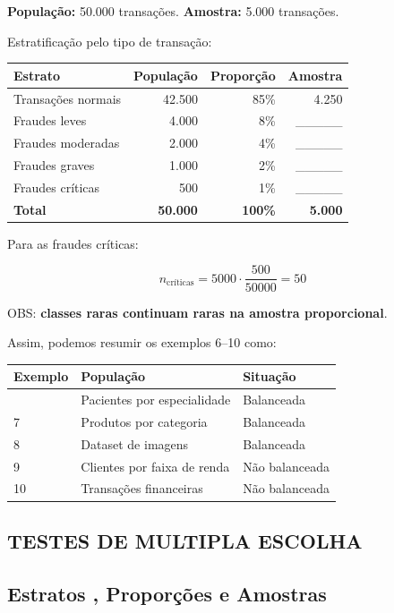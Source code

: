 \documentclass[
]{book}
\begin{document}
\textbf{População:} 50.000 transações.
\textbf{Amostra:} 5.000 transações.

Estratificação pelo tipo de transação:

\begin{longtable}[]{@{}lrrr@{}}
\toprule\noalign{}
Estrato & População & Proporção & Amostra \\
\midrule\noalign{}
\endhead
\bottomrule\noalign{}
\endlastfoot
Transações normais & 42.500 & 85\% & 4.250 \\
Fraudes leves & 4.000 & 8\% & \_\_\_\_\_ \\
Fraudes moderadas & 2.000 & 4\% & \_\_\_\_\_ \\
Fraudes graves & 1.000 & 2\% & \_\_\_\_\_ \\
Fraudes críticas & 500 & 1\% & \_\_\_\_\_ \\
\textbf{Total} & \textbf{50.000} & \textbf{100\%} & \textbf{5.000} \\
\end{longtable}

Para as fraudes críticas:

\[
n_{\text{críticas}} = 5000\cdot\frac{500}{50000} = 50
\]

OBS: \textbf{classes raras continuam raras na amostra proporcional}.

Assim, podemos resumir os exemplos 6--10 como:

\begin{longtable}[]{@{}lll@{}}
\toprule\noalign{}
Exemplo & População & Situação \\
\midrule\noalign{}
\endhead
\bottomrule\noalign{}
\endlastfoot
6 & Pacientes por especialidade & Balanceada \\
7 & Produtos por categoria & Balanceada \\
8 & Dataset de imagens & Balanceada \\
9 & Clientes por faixa de renda & Não balanceada \\
10 & Transações financeiras & Não balanceada \\
\end{longtable}

\subsection{TESTES DE MULTIPLA ESCOLHA}\label{testes-de-multipla-escolha-1}

\subsection{Estratos , Proporções e Amostras}\label{estratos-proporuxe7uxf5es-e-amostras}
\end{document}
